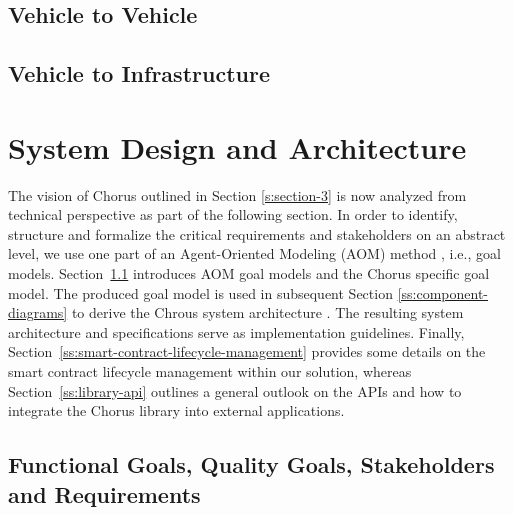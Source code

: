 \documentclass{llncs}
\begin{document}
{			\subsection{Vehicle to Vehicle}
			
			\subsection{Vehicle to Infrastructure}					
		


	
	
	\section{System Design and Architecture}
		\label{s:section-4}	


		The vision of Chorus outlined in Section \ref{s:section-3} is now analyzed from technical perspective as part of the following section. In order to identify, structure and formalize the critical requirements and stakeholders on an abstract level, we use one part of an Agent-Oriented Modeling (AOM) method \cite{sterling2009art}, i.e., goal models. Section~\ref{ss:requirement-engineering} introduces AOM goal models and the Chorus specific goal model. The produced goal model is used in subsequent Section \ref{ss:component-diagrams} to derive the Chrous system architecture . The resulting system architecture and specifications serve as implementation guidelines. Finally, Section~\ref{ss:smart-contract-lifecycle-management} provides some details on the smart contract lifecycle management within our solution, whereas Section~\ref{ss:library-api} outlines a general outlook on the APIs and how to integrate the Chorus library into external applications.
		
		
		
		\subsection{Functional Goals, Quality Goals, Stakeholders and Requirements}
			\label{ss:requirement-engineering}
						
}
\end{document}
